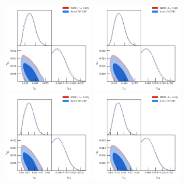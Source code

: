 \documentclass[prd,amsmath,amssymb,floatfix,superscriptaddress,nofootinbib]{revtex4-1}
\begin{document}
\begin{figure}
%
\includegraphics[width=0.35\textwidth]{results/cosmomc_kde/pl18_tanh_highz_test5_run1_vs_relike_tanh_highz_test9_run1_f0p28_taulo_prior_0p03_zre_prior_6p1_taulo_prior_0p0_tri_smooth_scale_1D_0.3_num_bins_1D_100_smooth_scale_2D_0.3_num_bins_2D_100.png}
\includegraphics[width=0.35\textwidth]{results/cosmomc_kde/pl18_tanh_highz_test5_run1_vs_relike_tanh_highz_test9_run1_f0p28_taulo_prior_0p03_zre_prior_6p1_taulo_prior_0p0_tri_smooth_scale_1D_0.5_num_bins_1D_100_smooth_scale_2D_0.5_num_bins_2D_100.png}
%
\includegraphics[width=0.35\textwidth]{results/cosmomc_kde/pl18_tanh_highz_test5_run1_vs_relike_tanh_highz_test9_run4_f0p18_taulo_prior_0p03_zre_prior_6p1_taulo_prior_0p0_tri_smooth_scale_1D_0.3_num_bins_1D_100_smooth_scale_2D_0.3_num_bins_2D_100.png}
\includegraphics[width=0.35\textwidth]{results/cosmomc_kde/pl18_tanh_highz_test5_run1_vs_relike_tanh_highz_test9_run4_f0p18_taulo_prior_0p03_zre_prior_6p1_taulo_prior_0p0_tri_smooth_scale_1D_0.5_num_bins_1D_100_smooth_scale_2D_0.5_num_bins_2D_100.png}

\end{figure}
\end{document}
